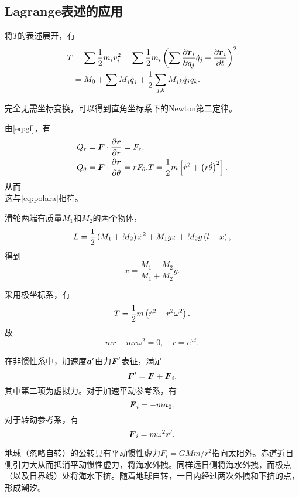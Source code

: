 \documentclass{ctexrep}
\begin{document}
\subsection{Lagrange表述的应用}
将$T$的表述展开，有
\begin{align}
  \label{eq:Texpand}
  T&=\sum \frac{1}{2} m_i v_i^2 = \sum \frac{1}{2} m_i\left(\sum \frac{\partial \boldsymbol{r}_i}{\partial q_j}\dot{q}_j+\frac{\partial \boldsymbol{r}_i}{\partial t}\right)^2\\
  &= M_0 + \sum M_j \dot{q}_j + \frac{1}{2} \sum_{j,k} M_{jk}\dot{q}_j\dot{q}_k.
\end{align}
\begin{ex}
  完全无需坐标变换，可以得到直角坐标系下的Newton第二定律。
\end{ex}
\begin{ex}[极坐标下的运动]
  由\eqref{eq:gf}，有
  \begin{align*}
    Q_r &= \boldsymbol{F}\cdot\frac{\partial \boldsymbol{r}}{\partial r}=F_r,\\
    Q_\theta &= \boldsymbol{F}\cdot\frac{\partial \boldsymbol{r}}{\partial \theta}=rF_\theta.
    T=\frac{1}{2} m\left[\dot{r}^2+\left(r\dot{\theta}\right)^2\right].
  \end{align*}
  从而
  \\
  这与\eqref{eq:polara}相符。
\end{ex}
\begin{ex}[Atwood滑轮]
  滑轮两端有质量$M_1$和$M_2$的两个物体，
  \[ L=\frac{1}{2}\left(M_1+M_2\right)\dot{x}^2+M_1 gx + M_2 g\left(l-x\right), \]
  得到
  \[ \ddot{x} = \frac{M_1-M_2}{M_1+M_2}g. \]
\end{ex}
\begin{ex}[系在匀速转动杆上的珠子]
  采用极坐标系，有
  \[ T = \frac{1}{2} m\left(\dot{r}^2+r^2\omega^2\right). \]
  故
  \[ m\ddot{r}-mr\omega^2=0, \quad r=e^{\omega t}. \]
\end{ex}
在非惯性系中，加速度$\boldsymbol{a}'$由力$\boldsymbol{F}'$表征，满足
\[ \boldsymbol{F}' = \boldsymbol{F} + \boldsymbol{F}_i. \]
其中第二项为虚拟力。对于加速平动参考系，有
\[ \boldsymbol{F}_i = -m\boldsymbol{a}_0. \]
对于转动参考系，有
\[ \boldsymbol{F}_i = m\omega^2\boldsymbol{r}'. \]
\begin{ex}[潮汐的定性解释]
  地球（忽略自转）的公转具有平动惯性虚力$F_i=GMm/r^2$指向太阳外。赤道近日侧引力大从而抵消平动惯性虚力，将海水外拽。同样远日侧将海水外拽，而极点（以及日界线）处将海水下挤。随着地球自转，一日内经过两次外拽和下挤的点，形成潮汐。
\end{ex}
\end{document}
